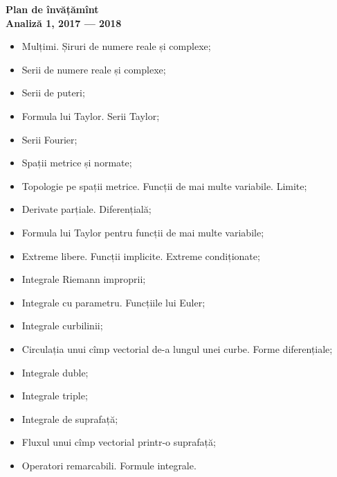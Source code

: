 \documentclass[a4paper,11pt]{article}
\begin{document}
\begin{center}
  {\Large\textbf{Plan de învățămînt \\ Analiză 1, 2017 --- 2018}}
\end{center}
\vspace{1cm}

\begin{itemize}
  \item Mulțimi. Șiruri de numere reale și complexe;
  \item Serii de numere reale și complexe;
  \item Serii de puteri;
  \item Formula lui Taylor. Serii Taylor;
  \item Serii Fourier;
  \item Spații metrice și normate;
  \item Topologie pe spații metrice. Funcții de mai multe variabile. Limite;
  \item Derivate parțiale. Diferențială;
  \item Formula lui Taylor pentru funcții de mai multe variabile;
  \item Extreme libere. Funcții implicite. Extreme condiționate;
  \item Integrale Riemann improprii;
  \item Integrale cu parametru. Funcțiile lui Euler;
  \item Integrale curbilinii;
  \item Circulația unui cîmp vectorial de-a lungul unei curbe. Forme diferențiale;
  \item Integrale duble;
  \item Integrale triple;
  \item Integrale de suprafață;
  \item Fluxul unui cîmp vectorial printr-o suprafață;
  \item Operatori remarcabili. Formule integrale.
\end{itemize}
\end{document}
